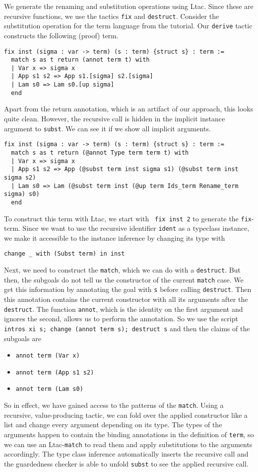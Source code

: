 \documentclass{scrartcl}
\newcommand{\lst}{\lstinline}
\begin{document}
We generate the renaming and substitution operations using Ltac. Since these are recursive functions, we use the tactics \lst$fix$ and \lst$destruct$. Consider the substitution operation for the term language from the tutorial. Our \lst$derive$ tactic constructs the following (proof) term.
\begin{lstlisting}
fix inst (sigma : var -> term) (s : term) {struct s} : term :=
  match s as t return (annot term t) with
  | Var x => sigma x
  | App s1 s2 => App s1.[sigma] s2.[sigma]
  | Lam s0 => Lam s0.[up sigma]
  end
\end{lstlisting}
Apart from the return annotation, which is an artifact of our approach, this looks quite clean. However, the recursive call is hidden in the implicit instance argument to \lst$subst$. We can see it if we show all implicit arguments.
\begin{lstlisting}
fix inst (sigma : var -> term) (s : term) {struct s} : term :=
  match s as t return (@annot Type term term t) with
  | Var x => sigma x
  | App s1 s2 => App (@subst term inst sigma s1) (@subst term inst sigma s2)
  | Lam s0 => Lam (@subst term inst (@up term Ids_term Rename_term sigma) s0)
  end
\end{lstlisting}

To construct this term with Ltac, we start with \lst$ fix inst 2$ to generate the \lst$fix$-term. Since we want to use the recursive identifier \lst$ident$ as a typeclass instance, we make it accessible to the instance inference by changing its type with 
\begin{lstlisting}
change _ with (Subst term) in inst  
\end{lstlisting}

Next, we need to construct the \lst$match$, which we can do with a \lst$destruct$. But then, the subgoals do not tell us the constructor of the current \lst$match$ case.
We get this information by annotating the goal with \lst$s$ before calling \lst$destruct$. Then this annotation contains the current constructor with all its arguments after the \lst$destruct$.
The function \lst$annot$, which is the identity on the first argument and ignores the second, allows us to perform the annotation. So we use the script \lst$intros xi s; change (annot term s); destruct s$
and then the claims of the subgoals are
\begin{itemize}
\item \lst$annot term (Var x)$
\item \lst$annot term (App s1 s2)$
\item \lst$annot term (Lam s0)$
\end{itemize}
So in effect, we have gained access to the patterns of the \lst$match$. Using a recursive, value-producing tactic, we can fold over the applied constructor like a list and change every argument depending on its type. The types of the arguments happen to contain the binding annotations in the definition of \lst$term$, so we can use an Ltac-\lst$match$ to read them and apply substitutions to the arguments accordingly. The type class inference automatically inserts the recursive call and the guardedness checker is able to unfold \lst$subst$ to see the applied recursive call.  
\end{document}
